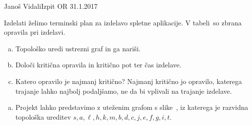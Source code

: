 \begin{naloga}{Janoš Vidali}{Izpit OR 31.1.2017}
\begin{vprasanje}
Izdelati želimo terminski plan za izdelavo spletne aplikacije.
V tabeli~\tab so zbrana opravila pri izdelavi.

\begin{enumerate}[(a)]
\item Topološko uredi ustrezni graf in ga nariši.
\item Določi kritična opravila in kritično pot ter čas izdelave.
\item Katero opravilo je najmanj kritično?
Najmanj kritično jo opravilo, katerega trajanje lahko najbolj podaljšamo,
ne da bi vplivali na trajanje izdelave.
\end{enumerate}

\begin{tabela}
\end{tabela}
\end{vprasanje}

\begin{odgovor}
\begin{enumerate}[(a)]
\item Projekt lahko predstavimo z uteženim grafom s slike~\fig,
iz katerega je razvidna topološka ureditev
$s, a, \ell, h, k, m, b, d, c, j, e, f, g, i, t$.


\end{enumerate}
\end{odgovor}
\end{naloga}
